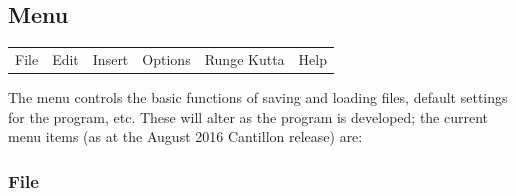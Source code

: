 \subsection{Menu}
\label{Menu}

  \begin{tabular}{llllll}
    File & Edit & Insert & Options & Runge Kutta & Help \\
  \end{tabular}

The menu controls the basic functions of saving and loading files,
default settings for the program, etc. These will alter as the program
is developed; the current menu items (as at the August 2016 Cantillon
release) are: 

\subsubsection{File}
\label{File}


